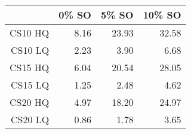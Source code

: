 \begin{table}[ht]
\begin{center}
\begin{tabular}{rrrr}
  \hline
 & 0\% SO & 5\% SO & 10\% SO \\
  \hline
 \small{CS10 HQ} & \small{8.16 }& \small{23.93 }& \small{32.58 }\\
 \small{CS10 LQ }& \small{2.23 }& \small{3.90 }& \small{6.68 }\\
 \small{CS15 HQ }& \small{6.04 }& \small{20.54} & \small{28.05 }\\
 \small{CS15 LQ }& \small{1.25 }& \small{2.48 }& \small{4.62 }\\
 \small{CS20 HQ }& \small{4.97 }& \small{18.20} & \small{24.97 }\\
 \small{CS20 LQ }& \small{0.86 }& \small{1.78 }& \small{3.65 }\\
   \hline
\end{tabular}
\end{center}
\end{table}

